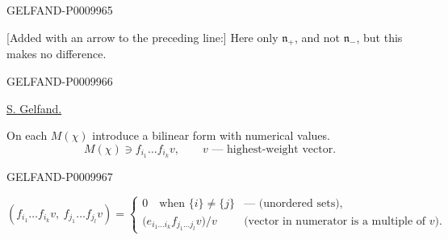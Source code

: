 \begin{GelfandAdjacentEvidence}{GELFAND-P000996}{5}


[Added with an arrow to the preceding line:] Here only $\mathfrak n_+$, and not $\mathfrak n_-$, but this makes no difference.
\end{GelfandAdjacentEvidence}
\begin{GelfandAdjacentEvidence}{GELFAND-P000996}{6}


\underline{S. Gelfand.}

On each $M(\chi)$ introduce a bilinear form with numerical values.
\[
M(\chi)\ni f_{i_1}\ldots f_{i_k}v,\qquad
v\text{ --- highest-weight vector}.
\]
\end{GelfandAdjacentEvidence}
\begin{GelfandAdjacentEvidence}{GELFAND-P000996}{7}

\[
(f_{i_1}\ldots f_{i_k}v,\ f_{j_1}\ldots f_{j_l}v)
=
\begin{cases}
0\quad\text{when }\{i\}\ne\{j\}
 & \text{--- (unordered sets)},\\
\bigl(e_{i_1\ldots i_k}f_{j_1\ldots j_l}v\bigr)/v
 & \text{(vector in numerator is a multiple of $v$)}.
\end{cases}
\]
\end{GelfandAdjacentEvidence}



